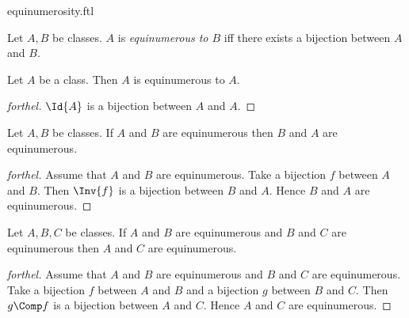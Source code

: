 \documentclass{stex}
\begin{document}
\begin{smodule}{equinumerosity.ftl}



\begin{definition*}[forthel,for=equinumerous]
  Let $A, B$ be classes.
  $A$ is \emph{equinumerous to $B$} iff there exists a bijection between $A$ and $B$.
\end{definition*}

\begin{proposition*}[forthel]
  Let $A$ be a class.
  Then $A$ is equinumerous to $A$.
\end{proposition*}
\begin{proof}[forthel]
  $\Id{A}$ is a bijection between $A$ and $A$.
\end{proof}

\begin{proposition*}[forthel]
  Let $A, B$ be classes.
  If $A$ and $B$ are equinumerous then $B$ and $A$ are equinumerous.
\end{proposition*}
\begin{proof}[forthel]
  Assume that $A$ and $B$ are equinumerous.
  Take a bijection $f$ between $A$ and $B$.
  Then $\Inv{f}$ is a bijection between $B$ and $A$.
  Hence $B$ and $A$ are equinumerous.
\end{proof}

\begin{proposition*}[forthel]
  Let $A, B, C$ be classes.
  If $A$ and $B$ are equinumerous and $B$ and $C$ are equinumerous then $A$ and $C$ are equinumerous.
\end{proposition*}
\begin{proof}[forthel]
  Assume that $A$ and $B$ are equinumerous and $B$ and $C$ are equinumerous.
  Take a bijection $f$ between $A$ and $B$ and a bijection $g$ between $B$ and $C$.
  Then $g \Comp f$ is a bijection between $A$ and $C$.
  Hence $A$ and $C$ are equinumerous.
\end{proof}

\end{smodule}
\end{document}
